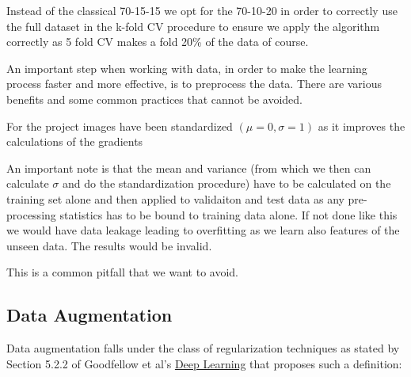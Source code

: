 Instead of the classical 70-15-15 we opt for the 70-10-20 in order to correctly use the full dataset in the
k-fold CV procedure to ensure we apply the algorithm correctly as 5 fold CV makes a fold 20\% of the data of course.

An important step when working with data, in order to make the learning process faster and more effective, is to
preprocess the data. There are various benefits and some common practices that cannot be avoided.

For the project images have been standardized $(\mu=0, \sigma=1)$ as it improves the calculations of the
gradients

An important note is that the mean and variance (from which we then can calculate $\sigma$ and do
the standardization procedure) have to be calculated on the training set alone and then applied to
validaiton and test data as any pre-processing statistics has to be bound to training data alone.
If not done like this we would have data leakage leading to overfitting as we learn also features of the unseen data.
The results would be invalid.

This is a common pitfall that we want to avoid.

\subsection{Data Augmentation}
Data augmentation falls under the class of regularization techniques as stated by Section 5.2.2 of Goodfellow et al's
\href{http://www.deeplearningbook.org/contents/ml.html}{Deep Learning} that proposes such a definition:

